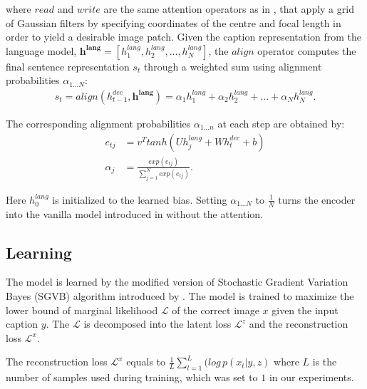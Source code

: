 \documentclass{article} %
\newcommand{\hlang}{h^{lang}}
\newcommand{\hlangall}{\boldsymbol{h^{lang}}}
\newcommand{\hdec}{h^{dec}}
\newcommand{\readop}{\mathit{read}}
\newcommand{\writeop}{\mathit{write}}
\newcommand{\loss}{\mathcal{L}}
\newcommand{\lloss}{\mathcal{L}^{z}}
\newcommand{\rloss}{\mathcal{L}^{x}}
\begin{document}
where $\readop$ and $\writeop$ are the same attention operators as in \citep{gregor_draw}, that apply a grid of Gaussian filters by specifying coordinates of the centre and focal length in order to yield a desirable image patch.
Given the caption representation from the language model, $\hlangall = [\hlang_{1}, \hlang_{2}, ..., \hlang_{N}]$, the $align$ operator computes the final sentence representation $s_t$ through a weighted sum using alignment probabilities $\alpha_{1...N}$:
\begin{align}
s_t=align(\hdec_{t-1}, \hlangall) = \alpha_{1}\hlang_{1} + \alpha_{2}\hlang_{2} + ... + \alpha_{N}\hlang_{N}.
\end{align}

The corresponding alignment probabilities $\alpha_{1...n}$ at each step are obtained by:
\begin{align}
e_{tj} &= v^{T}tanh(U\hlang_{j} + W\hdec_{t} + b)\\
\alpha_{j} &= \frac{exp(e_{tj})}{\sum_{j=1}^{N}exp(e_{tj})}.
\end{align}

Here $\hlang_{0}$ is initialized to the learned bias.
Setting $\alpha_{1...N}$ to $\frac{1}{N}$ turns the encoder into the vanilla model introduced in \citep{cho_mt} without the attention. 

\subsection{Learning}

The model is learned by the modified version of Stochastic Gradient Variation Bayes (SGVB) algorithm introduced by \cite{kingma_vae}. The model is trained to maximize the lower bound of marginal likelihood $\loss$ of the correct image $x$ given the input caption $y$. The $\loss$ is decomposed into the latent loss $\lloss$ and the reconstruction loss $\rloss$. 

The reconstruction loss $\rloss$ equals to $\frac{1}{L}\sum_{l=1}^{L}(log\,p(x_{t}|y,z)$ where $L$ is the number of samples used during training, which was set to $1$ in our experiments.
\end{document}
